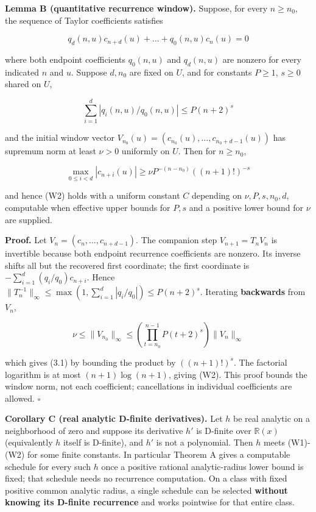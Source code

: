 \documentclass[11pt,a4paper]{article}
\begin{document}
\textbf{Lemma B (quantitative recurrence window).} Suppose, for every
\(n\ge n_0\), the sequence of Taylor coefficients satisfies

\[
q_d(n,u)c_{n+d}(u)+ \ldots + q_0(n,u)c_n(u)=0
\]

where both endpoint coefficients \(q_0(n,u)\) and \(q_d(n,u)\) are
nonzero for every indicated \(n\) and \(u\). Suppose \(d,n_0\) are fixed
on \(U\), and for constants \(P\ge 1\), \(s\ge 0\) shared on \(U\),

\[
\sum_{i=1}^d |q_i(n,u)/q_0(n,u)| \le  P(n+2)^s
\]

and the initial window vector
\(V_{n_0}(u)=(c_{n_0}(u),\ldots,c_{n_0+d-1}(u))\) has supremum norm at
least \(\nu>0\) uniformly on \(U\). Then for \(n\ge n_0\),

\[
\max_{0\le i< d}|c_{n+i}(u)| \ge  \nu P^{-(n-n_0)} ((n+1)!)^{-s} \tag{3.1}
\]

and hence (W2) holds with a uniform constant \(C\) depending on
\(\nu,P,s,n_0,d\), computable when effective upper bounds for \(P,s\)
and a positive lower bound for \(\nu\) are supplied.

\textbf{Proof.} Let \(V_n=(c_n,\ldots,c_{n+d-1})\). The companion step
\(V_{n+1}=T_n V_n\) is invertible because both endpoint recurrence
coefficients are nonzero. Its inverse shifts all but the recovered first
coordinate; the first coordinate is \(-\sum_{i=1}^d(q_i/q_0)c_{n+i}\).
Hence
\(\lVert T_n^{-1}\rVert_\infty\le\max\left(1,\sum_{i=1}^d|q_i/q_0|\right)\le P(n+2)^s\).
Iterating \textbf{backwards} from \(V_n\),

\[
\nu\le\lVert V_{n_0}\rVert_\infty\le\left(\prod_{t=n_0}^{n-1}P(t+2)^s\right)\lVert V_n\rVert_\infty
\]

which gives (3.1) by bounding the product by \(((n+1)!)^s\). The
factorial logarithm is at most \((n+1)\log(n+1)\), giving (W2). This
proof bounds the window norm, not each coefficient; cancellations in
individual coefficients are allowed. \(\square\)

\textbf{Corollary C (real analytic D-finite derivatives).} Let \(h\) be
real analytic on a neighborhood of zero and suppose its derivative
\(h'\) is D-finite over \(\mathbb R(x)\) (equivalently \(h\) itself is
D-finite), and \(h'\) is not a polynomial. Then \(h\) meets (W1)-(W2)
for some finite constants. In particular Theorem A gives a computable
schedule for every such \(h\) once a positive rational analytic-radius
lower bound is fixed; that schedule needs no recurrence computation. On
a class with fixed positive common analytic radius, a single schedule
can be selected \textbf{without knowing its D-finite recurrence} and
works pointwise for that entire class.
\end{document}
